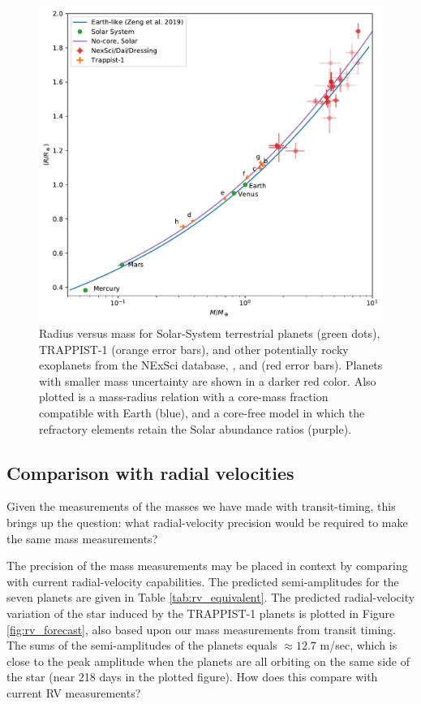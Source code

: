 \documentclass[fleqn,usenatbib]{mnras} %
\begin{document}
\begin{figure}
    \centering
    \includegraphics[width = \hsize]{figures/mass_radius_relation_comparison.pdf}
    \caption{Radius versus mass for Solar-System terrestrial planets (green dots),
    TRAPPIST-1 (orange error bars), and other potentially rocky exoplanets from the NExSci database, \citet{Dressing2015},
    and \citet{Dai2019}
    (red error bars).  Planets with smaller mass uncertainty are shown in a darker red color.  Also
    plotted is a mass-radius relation with a core-mass fraction compatible with Earth (blue), and a core-free model in which the refractory elements retain the Solar abundance ratios (purple).}
    \label{fig:mass_radius_comparison}
\end{figure}

\subsection{Comparison with radial velocities}

Given the measurements of the masses we have made with transit-timing,
this brings up the question:  what radial-velocity precision would be
required to make the same mass measurements?  

The precision of the mass measurements may be placed in
context by comparing with current radial-velocity capabilities.
The predicted semi-amplitudes for the seven planets are given
in Table \ref{tab:rv_equivalent}.
The predicted radial-velocity variation of the star induced by the TRAPPIST-1
planets is plotted in Figure \ref{fig:rv_forecast}, also based upon our
mass measurements from transit timing.  The sums of the semi-amplitudes 
of the planets equals $\approx 12.7$ m/sec, which is close to the
peak amplitude when the planets are all orbiting on the same side of
the star (near 218 days in the plotted figure).  How does this compare
with current RV measurements?
\end{document}
